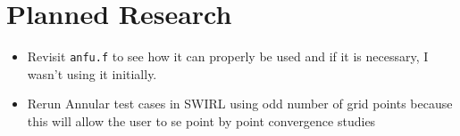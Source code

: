 \documentclass[a4paper]{article}
\begin{document}
\section{Planned Research}
\begin{itemize}
    \item Revisit \verb|anfu.f| to see how it can properly be used and if it
        is necessary, I wasn't using it initially.  
    \item Rerun Annular test cases in SWIRL using odd number of grid points because
        this will allow the user to se point by point convergence studies 
\end{itemize}
\end{document}
